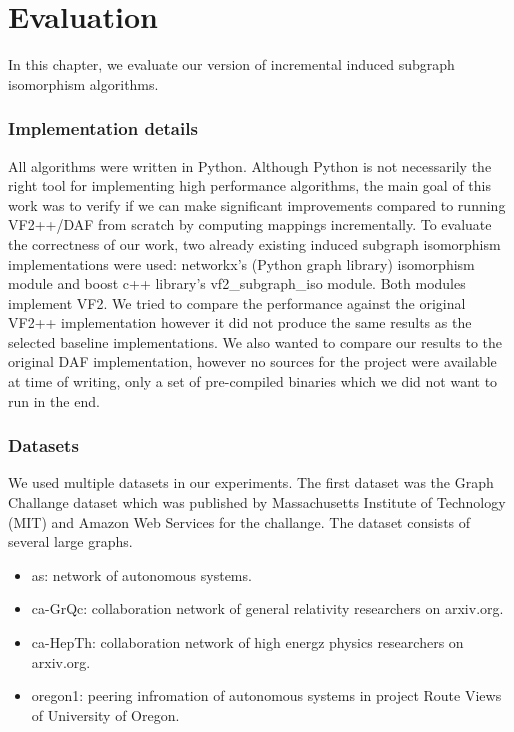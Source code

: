 \chapter{Evaluation}

In this chapter, we evaluate our version of incremental induced subgraph isomorphism algorithms.

\subsection{Implementation details}

All algorithms were written in Python. Although Python is not necessarily the right tool 
for implementing high performance algorithms, the main goal of this work was to verify if
we can make significant improvements compared to running VF2++/DAF from scratch by computing
mappings incrementally. To evaluate the correctness of our work, two already existing induced 
subgraph isomorphism implementations were used: networkx's (Python graph library) isomorphism 
module and boost c++ library's vf2\_subgraph\_iso module\cite{boostvf2}. Both modules implement VF2. We 
tried to compare the performance against the original VF2++ implementation \cite{lemonvf2pp}
however it did not produce the same results as the selected baseline implementations. We also
wanted to compare our results to the original DAF implementation, however no sources for the
project were available at time of writing, only a set of pre-compiled binaries \cite{dafbin}
which we did not want to run in the end.

\subsection{Datasets}

We used multiple datasets in our experiments. The first dataset was the Graph Challange\cite{graphchallenge} dataset
which was published by Massachusetts Institute of Technology (MIT) and Amazon Web Services for
the challange. The dataset consists of several large graphs. 

\begin{itemize}
    \item as: network of autonomous systems.
    \item ca-GrQc: collaboration network of general relativity researchers on arxiv.org.
    \item ca-HepTh: collaboration network of high energz physics researchers on arxiv.org.
    \item oregon1: peering infromation of autonomous systems in project Route Views of University of Oregon.
\end{itemize}

